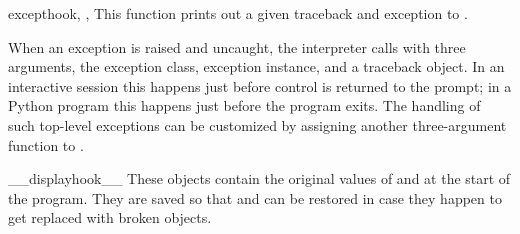 \begin{funcdesc}{excepthook}{, , }
This function prints out a given traceback and exception to
.

When an exception is raised and uncaught, the interpreter calls
 with three arguments, the exception class,
exception instance, and a traceback object.
In an interactive session this happens just before
control is returned to the prompt; in a Python program this happens
just before the program exits.
The handling of such top-level exceptions can be customized by
assigning another three-argument function to .
\end{funcdesc}

\begin{datadesc}{__displayhook__}
These objects contain the original values of 
and  at the start of the program.  They are saved
so that  and  can be restored
in case they happen to get replaced with broken objects.
\end{datadesc}

